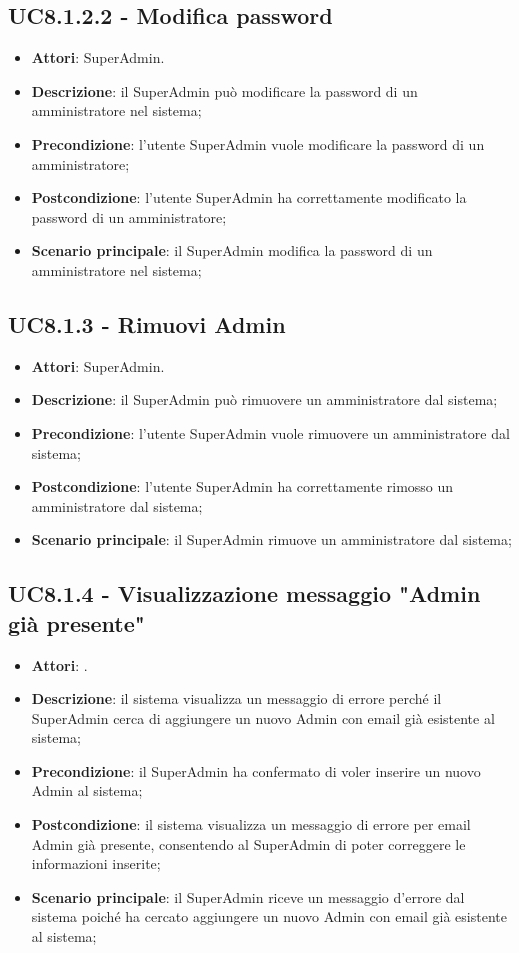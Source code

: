 \documentclass[../AnalisiDeiRequisiti_v3.0.0.tex]{subfiles}
\begin{document}
\subsection{UC8.1.2.2 - Modifica password} 
\label{sssec:UC8.1.2.2} 
\begin{itemize} 
\item \textbf{Attori}: SuperAdmin.
\item \textbf{Descrizione}: il SuperAdmin può modificare la password di un amministratore nel sistema;
\item \textbf{Precondizione}: l'utente SuperAdmin vuole modificare la password di un amministratore;
\item \textbf{Postcondizione}: l'utente SuperAdmin ha correttamente  modificato la password di un amministratore;
\item \textbf{Scenario principale}: il SuperAdmin modifica la password di un amministratore nel sistema;
\end{itemize} 
\subsection{UC8.1.3 - Rimuovi Admin} 
\label{sssec:UC8.1.3} 
\begin{itemize} 
\item \textbf{Attori}: SuperAdmin.
\item \textbf{Descrizione}: il SuperAdmin può rimuovere un amministratore dal sistema;
\item \textbf{Precondizione}: l'utente SuperAdmin vuole rimuovere un amministratore dal sistema;
\item \textbf{Postcondizione}: l'utente SuperAdmin ha correttamente  rimosso un amministratore dal sistema;
\item \textbf{Scenario principale}: il SuperAdmin rimuove un amministratore dal sistema;

\end{itemize} 
\subsection{UC8.1.4 - Visualizzazione messaggio "Admin già presente"} 
\label{sssec:UC8.1.4} 
\begin{itemize} 
\item \textbf{Attori}: .
\item \textbf{Descrizione}: il sistema visualizza un messaggio di errore perché il SuperAdmin cerca di aggiungere un nuovo Admin con email già esistente al sistema;
\item \textbf{Precondizione}: il SuperAdmin ha confermato di voler inserire un nuovo Admin al sistema;
\item \textbf{Postcondizione}: il sistema visualizza un messaggio di errore per email Admin già presente, consentendo al SuperAdmin di poter correggere le informazioni inserite;
\item \textbf{Scenario principale}: il SuperAdmin riceve un messaggio d'errore dal sistema poiché ha cercato aggiungere un nuovo Admin con email già esistente al sistema;
\end{itemize} 
\end{document}
